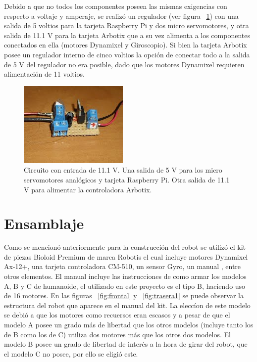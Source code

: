 Debido a que no todos los componentes poseen las mismas exigencias con respecto a voltaje y amperaje, se realizó un regulador (ver figura ~\ref{fig:circuito}) con una salida de 5 voltios para la tarjeta Raspberry Pi y dos micro servomotores, y otra salida de 11.1 V para la tarjeta Arbotix que a su vez alimenta a los componentes conectados en ella (motores Dynamixel y Giroscopio). Si bien la tarjeta Arbotix posee un regulador interno de cinco voltios la opción de conectar todo a la salida de 5 V del regulador no era posible, dado que los motores Dynamixel requieren alimentación de 11 voltios.

\begin{figure}[hbtp]
\centering
\includegraphics[scale=0.5]{imagenes/circuito.jpg}
\caption{Circuito con entrada de 11.1 V. Una salida de 5 V para los micro servomotores anal\'ogicos y tarjeta Raspberry Pi. Otra salida de 11.1 V para alimentar la controladora Arbotix.}
\label{fig:circuito}
\end{figure}


\section{Ensamblaje}\label{subsection:construccion}

Como se mencionó anteriormente para la construcción del robot se utilizó el kit de piezas Bioloid Premium de marca Robotis el cual incluye motores Dynamixel Ax-12+, una tarjeta controladora CM-510, un sensor Gyro, un manual \cite{manualRobot}, entre otros elementos. El manual incluye las instrucciones de como armar los modelos A, B y C de humanoide, el utilizado en este proyecto es el tipo B, haciendo uso de 16 motores. En las figuras ~\ref{fig:frontal} y ~\ref{fig:trasera1}  se puede observar la estructura del robot que aparece en el manual del kit. La elecc\'ion de este modelo se debi\'o a que los motores como recuersos eran escasos y a pesar de que el modelo A posee un grado más de libertad que los otros modelos (incluye tanto los de B como los de C) utiliza dos motores más que los otros dos modelos. El modelo B posee un grado de libertad de interés a la hora de girar del robot, que el modelo C no posee, por ello se eligi\'o este.

